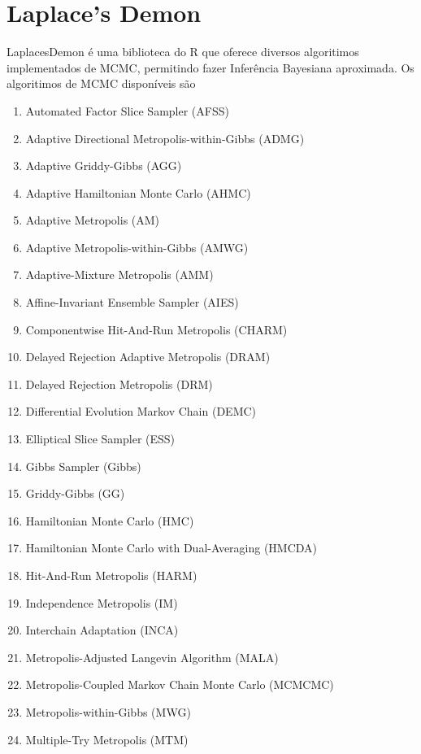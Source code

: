 \documentclass[
]{book}
\providecommand{\tightlist}{%
  \setlength{\itemsep}{0pt}\setlength{\parskip}{0pt}}
\begin{document}
\hypertarget{laplaces-demon}{%
\section{Laplace's Demon}\label{laplaces-demon}}

LaplacesDemon é uma biblioteca do R que oferece diversos algoritimos implementados de MCMC, permitindo fazer Inferência Bayesiana aproximada. Os algoritimos de MCMC disponíveis são

\begin{enumerate}
\def\labelenumi{\arabic{enumi}.}
\tightlist
\item
  Automated Factor Slice Sampler (AFSS)
\item
  Adaptive Directional Metropolis-within-Gibbs (ADMG)
\item
  Adaptive Griddy-Gibbs (AGG)
\item
  Adaptive Hamiltonian Monte Carlo (AHMC)
\item
  Adaptive Metropolis (AM)
\item
  Adaptive Metropolis-within-Gibbs (AMWG)
\item
  Adaptive-Mixture Metropolis (AMM)
\item
  Affine-Invariant Ensemble Sampler (AIES)
\item
  Componentwise Hit-And-Run Metropolis (CHARM)
\item
  Delayed Rejection Adaptive Metropolis (DRAM)
\item
  Delayed Rejection Metropolis (DRM)
\item
  Differential Evolution Markov Chain (DEMC)
\item
  Elliptical Slice Sampler (ESS)
\item
  Gibbs Sampler (Gibbs)
\item
  Griddy-Gibbs (GG)
\item
  Hamiltonian Monte Carlo (HMC)
\item
  Hamiltonian Monte Carlo with Dual-Averaging (HMCDA)
\item
  Hit-And-Run Metropolis (HARM)
\item
  Independence Metropolis (IM)
\item
  Interchain Adaptation (INCA)
\item
  Metropolis-Adjusted Langevin Algorithm (MALA)
\item
  Metropolis-Coupled Markov Chain Monte Carlo (MCMCMC)
\item
  Metropolis-within-Gibbs (MWG)
\item
  Multiple-Try Metropolis (MTM)

\end{enumerate}
\end{document}
